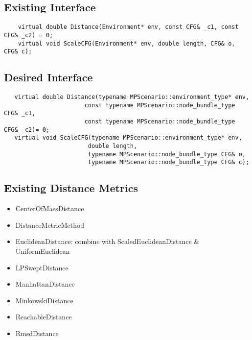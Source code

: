 \subsection{Existing Interface}

\begin{lstlisting}
    virtual double Distance(Environment* env, const CFG& _c1, const CFG& _c2) = 0;
    virtual void ScaleCFG(Environment* env, double length, CFG& o, CFG& c);
\end{lstlisting}

\subsection{Desired Interface}
\begin{lstlisting}
   virtual double Distance(typename MPScenario::environment_type* env, 
                       const typename MPScenario::node_bundle_type CFG& _c1,
                       const typename MPScenario::node_bundle_type CFG& _c2)= 0;
   virtual void ScaleCFG(typename MPScenario::environment_type* env, 
                        double length, 
                        typename MPScenario::node_bundle_type CFG& o, 
                        typename MPScenario::node_bundle_type CFG& c);
\end{lstlisting}
\subsection{Existing Distance Metrics}
\begin{itemize}
\item CenterOfMassDistance
\item DistanceMetricMethod
\item EuclideanDistance: combine with ScaledEuclideanDistance \& UniformEuclidean
\item LPSweptDistance
\item ManhattanDistance
\item MinkowskiDistance
\item ReachableDistance
\item RmsdDistance
\end{itemize}